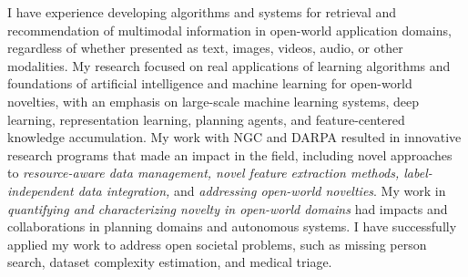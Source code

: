 \documentclass[11pt]{article}
\renewcommand*\paragraph[1]{}
\begin{document}
\paragraph{1 and P1) current research portfolio, accomplishments, and future research goals}

I have experience developing algorithms and systems for retrieval and recommendation of multimodal information in open-world application domains, regardless of whether presented as text, images, videos, audio, or other modalities. My research focused on real applications of learning algorithms and foundations of artificial intelligence and machine learning for open-world novelties, with an emphasis on large-scale machine learning systems, deep learning, representation learning, planning agents, and feature-centered knowledge accumulation. My work with NGC and DARPA resulted in innovative research programs that made an impact in the field, including novel approaches to \textit{resource-aware data management, novel feature extraction methods, label-independent data integration,} and \textit{addressing open-world novelties}. My work in \textit{quantifying and characterizing novelty in open-world domains} had impacts and collaborations in planning domains and autonomous systems. I have successfully applied my work to address open societal problems, such as missing person search, dataset complexity estimation, and medical triage.
\end{document}
